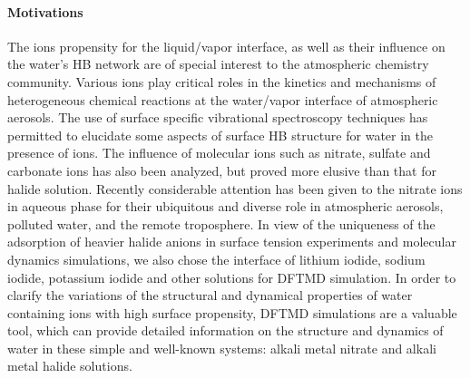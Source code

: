 \paragraph{Motivations}
%
The ions propensity for the liquid/vapor interface, as well as their influence on  
the water's HB network are of special interest to the atmospheric chemistry community.%
Various ions play critical roles in the kinetics and mechanisms of heterogeneous chemical reactions 
at the water/vapor interface of atmospheric aerosols. 
The use of surface specific vibrational spectroscopy techniques has 
permitted to elucidate some aspects of surface HB structure for water in 
the presence of ions\cite{AJ12,AGL05}. The influence of molecular ions such as nitrate­, sulfate­ and 
carbonate ions­ has also been analyzed, but proved more elusive than that for halide solution\cite{SG05,PS03}.
Recently considerable attention has been given to the nitrate ions in aqueous phase 
for their ubiquitous and diverse role in atmospheric aerosols, polluted water, 
and the remote troposphere\cite{Pitts2000,XuM2009,Jubb2012}.
In view of the uniqueness of the adsorption of heavier halide anions in surface tension experiments and molecular dynamics simulations, 
we also chose the interface of lithium iodide, sodium iodide, potassium iodide and other solutions for DFTMD simulation.
In order to clarify the variations of the structural and dynamical properties 
of water containing ions with high surface propensity, DFTMD simulations are a valuable tool, 
which can provide detailed information on the structure and dynamics  
of water in these simple and well-known systems: alkali metal nitrate and alkali metal halide solutions\cite{KM98}.


